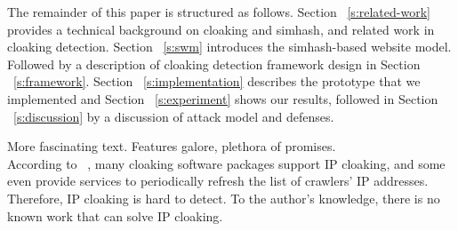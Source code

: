 The remainder of this paper is structured as follows. Section
~\autoref{s:related-work} provides a
technical background on cloaking and simhash, and related work in cloaking
detection. Section ~\autoref{s:swm} introduces the simhash-based website model.
Followed by a description of cloaking detection framework design in 
Section ~\autoref{s:framework}. Section ~\autoref{s:implementation} describes the 
prototype that we implemented and Section ~\autoref{s:experiment} shows our results,
followed in  Section ~\autoref{s:discussion} by a discussion of attack
model and defenses.



More fascinating text. Features galore, plethora of promises.\\


According to ~\cite{lin2009detection}, many cloaking software packages support
IP cloaking, and some even provide services to periodically refresh the list of
crawlers’ IP addresses. Therefore, IP cloaking is hard to detect. To the
author's knowledge, there is no known work that can solve IP
cloaking.


